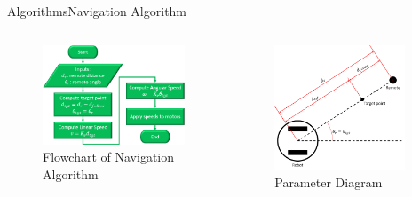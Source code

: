 \documentclass{beamer}
\begin{document}
\begin{frame}{Algorithms}{Navigation Algorithm}
  \begin{columns}
      \begin{figure}
        \centering
        \includegraphics[width=\textwidth]{figs/img/navigationAlgoFlowchart.png}
        \caption{Flowchart of Navigation Algorithm}
      \end{figure}
      \begin{figure}
        \centering
        \includegraphics[width=0.9\textwidth]{figs/img/navAlgoDiagram.png}
        \caption{Parameter Diagram}
      \end{figure}
  \end{columns}
\end{frame}
\end{document}
